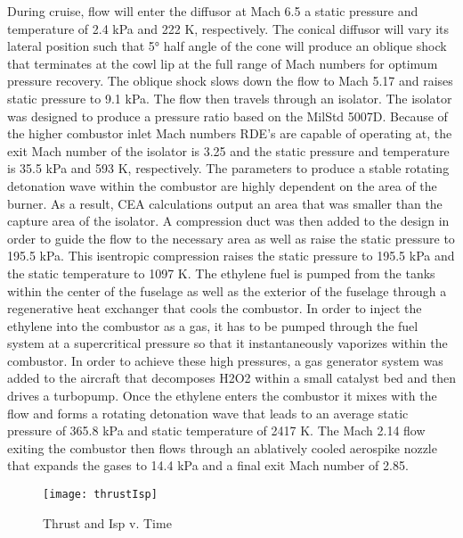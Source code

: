 During cruise, flow will enter the diffusor at Mach 6.5 a static pressure and temperature of 2.4 kPa and 222 K, respectively. The conical diffusor will vary its lateral position such that \ang{5} half angle of the cone will produce an oblique shock that terminates at the cowl lip at the full range of Mach numbers for optimum pressure recovery. The oblique shock slows down the flow to Mach 5.17 and raises static pressure to 9.1 kPa. The flow then travels through an isolator. The isolator was designed to produce a pressure ratio based on the MilStd 5007D. Because of the higher combustor inlet Mach numbers RDE’s are capable of operating at, the exit Mach number of the isolator is 3.25 and the static pressure and temperature is 35.5 kPa and 593 K, respectively. The parameters to produce a stable rotating detonation wave within the combustor are highly dependent on the area of the burner. As a result, CEA calculations output an area that was smaller than the capture area of the isolator. A compression duct was then added to the design in order to guide the flow to the necessary area as well as raise the static pressure to 195.5 kPa. This isentropic compression raises the static pressure to 195.5 kPa and the static temperature to 1097 K.
        	The ethylene fuel is pumped from the tanks within the center of the fuselage as well as the exterior of the fuselage through a regenerative heat exchanger that cools the combustor. In order to inject the ethylene into the combustor as a gas, it has to be pumped through the fuel system at a supercritical pressure so that it instantaneously vaporizes within the combustor. In order to achieve these high pressures, a gas generator system was added to the aircraft that decomposes H2O2 within a small catalyst bed and then drives a turbopump. Once the ethylene enters the combustor it mixes with the flow and forms a rotating detonation wave that leads to an average static pressure of 365.8 kPa and static temperature of 2417 K. The Mach 2.14 flow exiting the combustor then flows through an ablatively cooled aerospike nozzle that expands the gases to 14.4 kPa and a final exit Mach number of 2.85.

\begin{figure}[H]
\begin{center}
\texttt{[image: thrustIsp]}
\caption{Thrust and Isp v. Time}
\label{fig:thrustIsp}
\end{center}
\end{figure}





